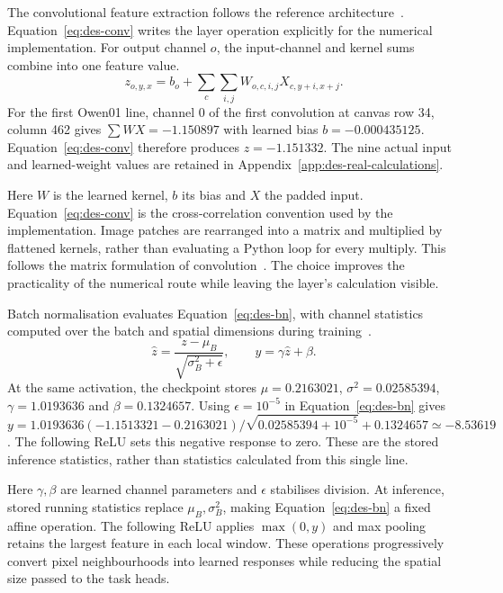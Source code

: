 The convolutional feature extraction follows the reference architecture~\cite[pp.~4--5]{kizilirmak2023}. Equation~\ref{eq:des-conv} writes the layer operation explicitly for the numerical implementation. For output channel $o$, the input-channel and kernel sums combine into one feature value.
\begin{equation}
z_{o,y,x}=b_o+\sum_c\sum_{i,j}W_{o,c,i,j}X_{c,y+i,x+j}.
\label{eq:des-conv}
\end{equation}
For the first Owen01 line, channel 0 of the first convolution at canvas row 34, column 462 gives $\sum WX=-1.150897$ with learned bias $b=-0.000435125$. Equation~\ref{eq:des-conv} therefore produces $z=-1.151332$. The nine actual input and learned-weight values are retained in Appendix~\ref{app:des-real-calculations}.

Here $W$ is the learned kernel, $b$ its bias and $X$ the padded input. Equation~\ref{eq:des-conv} is the cross-correlation convention used by the implementation. Image patches are rearranged into a matrix and multiplied by flattened kernels, rather than evaluating a Python loop for every multiply. This follows the matrix formulation of convolution~\cite[page to verify]{chellapilla2006}. The choice improves the practicality of the numerical route while leaving the layer's calculation visible.

Batch normalisation evaluates Equation~\ref{eq:des-bn}, with channel statistics computed over the batch and spatial dimensions during training~\cite[PDF pp.~4--5, Alg.~1]{ioffe2015}.
\begin{equation}
\widehat z=\frac{z-\mu_B}{\sqrt{\sigma_B^2+\epsilon}},\qquad
y=\gamma\widehat z+\beta.
\label{eq:des-bn}
\end{equation}
At the same activation, the checkpoint stores $\mu=0.2163021$, $\sigma^2=0.02585394$, $\gamma=1.0193636$ and $\beta=0.1324657$. Using $\epsilon=10^{-5}$ in Equation~\ref{eq:des-bn} gives $y=1.0193636(-1.1513321-0.2163021)/\sqrt{0.02585394+10^{-5}}+0.1324657\simeq-8.53619$. The following ReLU sets this negative response to zero. These are the stored inference statistics, rather than statistics calculated from this single line.

Here $\gamma,\beta$ are learned channel parameters and $\epsilon$ stabilises division. At inference, stored running statistics replace $\mu_B,\sigma_B^2$, making Equation~\ref{eq:des-bn} a fixed affine operation. The following ReLU applies $\max(0,y)$ and max pooling retains the largest feature in each local window. These operations progressively convert pixel neighbourhoods into learned responses while reducing the spatial size passed to the task heads.

